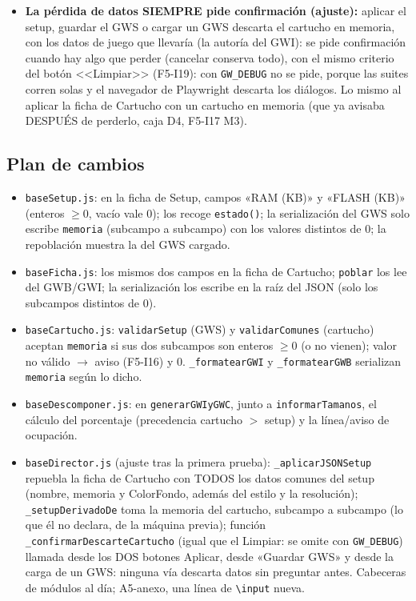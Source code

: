 \begin{itemize}
	\item \textbf{La pérdida de datos SIEMPRE pide confirmación (ajuste):}
	aplicar el setup, guardar el GWS o cargar un GWS descarta el cartucho
	en memoria, con los datos de juego que llevaría (la autoría del GWI):
	se pide confirmación cuando hay algo que perder (cancelar conserva
	todo), con el mismo criterio del botón <<Limpiar>> (F5-I19): con
	\texttt{GW\_DEBUG} no se pide, porque las suites corren solas y el
	navegador de Playwright descarta los diálogos. Lo mismo al aplicar la
	ficha de Cartucho con un cartucho en memoria (que ya avisaba
	DESPUÉS de perderlo, caja D4, F5-I17 M3).
\end{itemize}


\subsection{Plan de cambios}
\label{sec:F5I20Plan}

\begin{itemize}
	\item \texttt{baseSetup.js}: en la ficha de Setup, campos
	«RAM (KB)»{} y «FLASH
	(KB)»{} (enteros $\ge 0$, vacío vale 0); los recoge
	\texttt{estado()}; la serialización del GWS solo escribe
	\texttt{memoria} (subcampo a subcampo) con los valores distintos de 0;
	la repoblación muestra la del GWS cargado.
	\item \texttt{baseFicha.js}: los mismos dos campos en la ficha de
	Cartucho; \texttt{poblar} los lee del GWB/GWI; la serialización los
	escribe en la raíz del JSON (solo los subcampos distintos de 0).
	\item \texttt{baseCartucho.js}: \texttt{validarSetup} (GWS) y
	\texttt{validarComunes} (cartucho) aceptan \texttt{memoria} si sus dos
	subcampos son enteros $\ge 0$ (o no vienen); valor no válido $\to$
	aviso (F5-I16) y 0. \texttt{\_formatearGWI} y \texttt{\_formatearGWB}
	serializan \texttt{memoria} según lo dicho.
	\item \texttt{baseDescomponer.js}: en \texttt{generarGWIyGWC}, junto a
	\texttt{informarTamanos}, el cálculo del porcentaje (precedencia
	cartucho $>$ setup) y la línea/aviso de ocupación.
	\item \texttt{baseDirector.js} (ajuste tras la primera prueba):
	\texttt{\_aplicarJSONSetup} repuebla la ficha de Cartucho con TODOS los
	datos comunes del setup (nombre, memoria y ColorFondo, además del
	estilo y la resolución); \texttt{\_setupDerivadoDe} toma la memoria
	del cartucho, subcampo a subcampo (lo que él no declara, de la máquina
	previa); función \texttt{\_confirmarDescarteCartucho}
	(igual que el Limpiar: se omite con \texttt{GW\_DEBUG}) llamada desde
	los DOS botones Aplicar, desde «Guardar GWS» y desde la carga de un
	GWS: ninguna vía descarta datos sin preguntar antes.
	Cabeceras de módulos al día; A5-anexo, una línea de
	\texttt{\textbackslash input} nueva.
\end{itemize}


